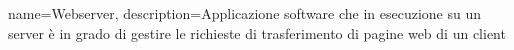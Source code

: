 {
	name={Webserver},
	description={Applicazione software che in esecuzione su un server è in grado di gestire le richieste di trasferimento di pagine web di un client}
}